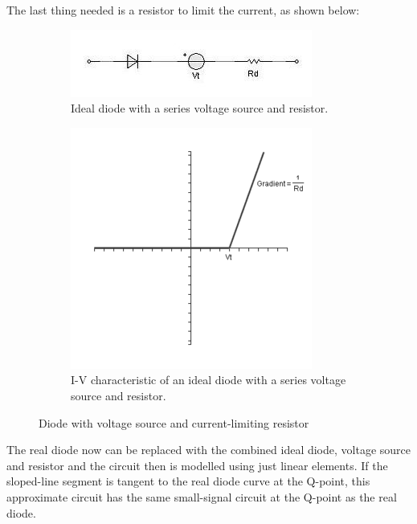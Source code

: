 The last thing needed is a resistor to limit the current, as shown below:

\begin{figure}[H]
  \centering
  \begin{subfigure}{.4\textwidth}
    \centering
    \includegraphics[width=\linewidth]{figures/Diode_Modelling_Image9}
    \caption{Ideal diode with a series voltage source and resistor.}
  \end{subfigure}
  \begin{subfigure}{.4\textwidth}
    \centering
    \includegraphics[width=\linewidth]{figures/Diode_Modelling_Image11}
    \caption{I-V characteristic of an ideal diode with a series voltage source and resistor.}
  \end{subfigure}
  \caption{Diode with voltage source and current-limiting resistor}
\end{figure}

The real diode now can be replaced with the combined ideal diode, voltage source and resistor and the circuit then is modelled using just linear elements. If the sloped-line segment is tangent to the real diode curve at the Q-point, this approximate circuit has the same small-signal circuit at the Q-point as the real diode.

